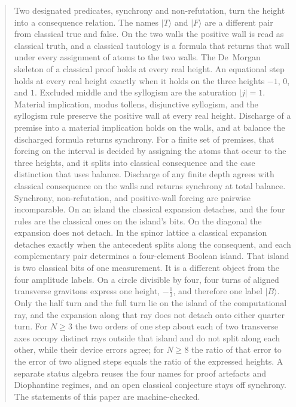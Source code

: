\documentclass[a4paper]{article}
\theoremstyle{definition}
\begin{document}
\begin{abstract}
Two designated predicates, synchrony and non-refutation, turn the
height into a consequence relation. The names \(\lvert T\rangle\) and
\(\lvert F\rangle\) are a different pair from classical true and false.
On the two walls the positive wall is read as classical truth, and a
classical tautology is a formula that returns that wall under every
assignment of atoms to the two walls. The De~Morgan skeleton of a
classical proof holds at every real height. An equational step holds
at every real height exactly when it holds on the three heights
\(-1\), \(0\), and \(1\). Excluded middle and the syllogism are the
saturation \(|j|=1\). Material implication, modus tollens, disjunctive
syllogism, and the syllogism rule preserve the positive wall at every
real height. Discharge of a premise into a material implication holds
on the walls, and at balance the discharged formula returns synchrony.
For a finite set of premises, that forcing on the interval is decided by
assigning the atoms that occur to the three heights, and it splits into
classical consequence and the case distinction that uses balance.
Discharge of any finite depth agrees with classical consequence on the
walls and returns synchrony at total balance. Synchrony, non-refutation,
and positive-wall forcing are pairwise incomparable. On an island the
classical expansion detaches, and the four rules are the classical ones
on the island's bits. On the diagonal the expansion does not detach.
In the spinor lattice a
classical expansion detaches exactly when the antecedent splits along
the consequent, and each complementary pair determines a four-element
Boolean island. That island is two classical bits of one measurement.
It is a different object from the four amplitude labels. On a circle
divisible by four, four turns of aligned transverse gravitons express
one height, \(-\frac13\), and therefore one label \(\lvert B\rangle\).
Only the half turn and the full turn lie on the island of the
computational ray, and the expansion along that ray does not detach
onto either quarter turn. For \(N\ge 3\) the two orders of one step
about each of two transverse axes occupy distinct rays outside that
island and do not split along each other, while their device errors
agree; for \(N\ge 8\) the ratio of that error to the error of two
aligned steps equals the ratio of the expressed heights. A separate
status algebra reuses the four names for proof artefacts and
Diophantine regimes, and an open classical conjecture stays off
synchrony. The statements of this paper are machine-checked.
\end{abstract}
\end{document}
